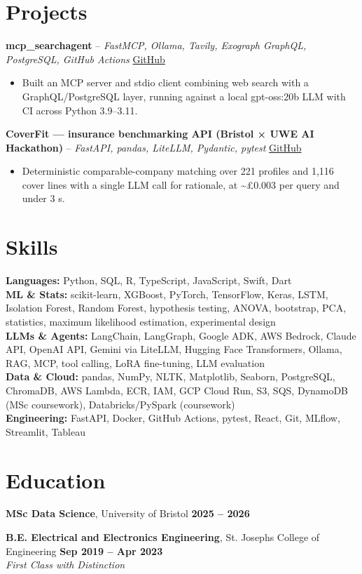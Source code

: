 \documentclass[a4paper,10pt]{article}
\begin{document}
\section{Projects}
\noindent\textbf{mcp\_searchagent} -- \textit{FastMCP, Ollama, Tavily, Exograph GraphQL, PostgreSQL, GitHub Actions} \hfill \href{https://github.com/Thiruvel-AP/mcp_searchagent}{GitHub}
\begin{itemize}
  \item Built an MCP server and stdio client combining web search with a GraphQL/PostgreSQL layer, running against a local gpt-oss:20b LLM with CI across Python 3.9–3.11.
\end{itemize}
\noindent\textbf{CoverFit — insurance benchmarking API (Bristol × UWE AI Hackathon)} -- \textit{FastAPI, pandas, LiteLLM, Pydantic, pytest} \hfill \href{https://github.com/Thiruvel-AP/AIHackathon-Phoenix}{GitHub}
\begin{itemize}
  \item Deterministic comparable-company matching over 221 profiles and 1,116 cover lines with a single LLM call for rationale, at \textasciitilde{}£0.003 per query and under 3 s.
\end{itemize}

\section{Skills}
\textbf{Languages:} Python, SQL, R, TypeScript, JavaScript, Swift, Dart\\
\textbf{ML \& Stats:} scikit-learn, XGBoost, PyTorch, TensorFlow, Keras, LSTM, Isolation Forest, Random Forest, hypothesis testing, ANOVA, bootstrap, PCA, statistics, maximum likelihood estimation, experimental design\\
\textbf{LLMs \& Agents:} LangChain, LangGraph, Google ADK, AWS Bedrock, Claude API, OpenAI API, Gemini via LiteLLM, Hugging Face Transformers, Ollama, RAG, MCP, tool calling, LoRA fine-tuning, LLM evaluation\\
\textbf{Data \& Cloud:} pandas, NumPy, NLTK, Matplotlib, Seaborn, PostgreSQL, ChromaDB, AWS Lambda, ECR, IAM, GCP Cloud Run, S3, SQS, DynamoDB (MSc coursework), Databricks/PySpark (coursework)\\
\textbf{Engineering:} FastAPI, Docker, GitHub Actions, pytest, React, Git, MLflow, Streamlit, Tableau

\section{Education}
\textbf{MSc Data Science}, University of Bristol \hfill \textbf{2025 – 2026}\par
\vspace{2pt}
\textbf{B.E. Electrical and Electronics Engineering}, St. Joseph\textquotesingle{}s College of Engineering \hfill \textbf{Sep 2019 – Apr 2023}\\ \textit{First Class with Distinction}\par
\end{document}
